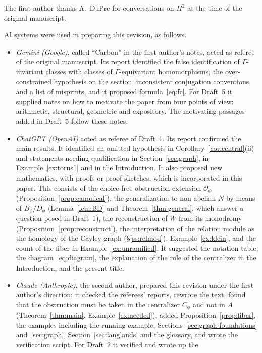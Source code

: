 \documentclass[12pt,letterpaper]{article}
\numberwithin{equation}{section}
\theoremstyle{plain}
\theoremstyle{definition}
\begin{document}
The first author thanks A.~DuPre for conversations on $H^2$ at the time
of the original manuscript.

AI systems were used in preparing this revision, as follows.
\begin{itemize}[itemsep=2pt]
\item \emph{Gemini (Google)}, called ``Carbon'' in the first author's notes,
acted as referee of the original manuscript. Its report identified the
false identification of $\Gamma$-invariant classes with classes of
$\Gamma$-equivariant homomorphisms, the over-constrained hypothesis on the
section, inconsistent conjugation conventions, and a list of misprints,
and it proposed formula~\eqref{eq:fc}. For Draft~5 it supplied notes on
how to motivate the paper from four points of view: arithmetic,
structural, geometric and expository. The motivating passages added in
Draft~5 follow these notes.
\item \emph{ChatGPT (OpenAI)} acted as referee of Draft~1. Its report
confirmed the main results. It identified an omitted hypothesis in
Corollary~\ref{cor:central}(ii) and statements needing qualification in
Section~\ref{sec:graph}, in Example~\ref{ex:torus1} and in the
Introduction. It also proposed new mathematics, with proofs or proof
sketches, which is incorporated in this paper. This consists of the
choice-free obstruction extension $\mathcal{O}_\phi$
(Proposition~\ref{prop:canonical}), the generalization to non-abelian $N$
by means of $B_\phi/D_\phi$ (Lemma~\ref{lem:BD} and
Theorem~\ref{thm:general}, which answer a question posed in Draft~1), the
reconstruction of $W$ from its monodromy
(Proposition~\ref{prop:reconstruct}), the interpretation of the relation
module as the homology of the Cayley graph (\S\ref{ss:relmod}),
Example~\ref{ex:klein}, and the count of the fiber in
Example~\ref{ex:unramified}. It suggested the notation table, the
diagram~\eqref{eq:diagram}, the explanation of the role of the
centralizer in the Introduction, and the present title.
\item \emph{Claude (Anthropic)}, the second author, prepared this revision
under the first author's direction: it checked the referees' reports, rewrote the text, found that
the obstruction must be taken in the centralizer $C_\phi$ and not in $A$
(Theorem~\ref{thm:main}, Example~\ref{ex:needed}), added
Proposition~\ref{prop:fiber}, the examples including the running example,
Sections~\ref{sec:graph-foundations} and~\ref{sec:graph}, Section~\ref{sec:langlands} and the glossary, and
wrote the verification script. For Draft~2 it verified and wrote up the

\end{itemize}
\end{document}

